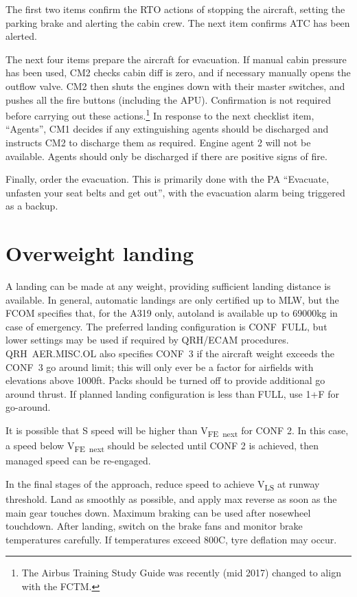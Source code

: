 \documentclass[a5paper,11pt,twoside]{book}
\newcommand{\multicite}[1]{
  \nopagebreak
  \noindent{\footnotesize\color{blue}{[ #1 ]}}
}
\newcommand{\V}[1]{V\textsubscript{#1}}
\begin{document}
The first two items confirm the RTO actions of stopping the aircraft, setting
the parking brake and alerting the cabin crew. The next item confirms ATC has
been alerted.

The next four items prepare the aircraft for evacuation. If manual cabin
pressure has been used, CM2 checks cabin diff is zero, and if necessary manually
opens the outflow valve. CM2 then shuts the engines down with their master
switches, and pushes all the fire buttons (including the APU). Confirmation is
not required before carrying out these actions.\footnote{The Airbus Training
Study Guide was recently (mid 2017) changed to align with the FCTM.}  In
response to the next checklist item, “Agents”, CM1 decides if any extinguishing
agents should be discharged and instructs CM2 to discharge them as
required. Engine agent 2 will not be available. Agents should only be discharged
if there are positive signs of fire.

Finally, order the evacuation. This is primarily done with the PA “Evacuate,
unfasten your seat belts and get out”, with the evacuation alarm being triggered
as a backup.

\multicite{EOMB~3.80.1, FCOM~PRO.AER.MISC, FCTM~PRO.AER.MISC}


\section{Overweight landing}

A landing can be made at any weight, providing sufficient landing distance is
available. In general, automatic landings are only certified up to MLW, but the
FCOM specifies that, for the A319 only, autoland is available up to 69000kg in
case of emergency. The preferred landing configuration is CONF~FULL, but lower
settings may be used if required by QRH/ECAM procedures. QRH~AER.MISC.OL also
specifies CONF~3 if the aircraft weight exceeds the CONF~3 go around limit; this
will only ever be a factor for airfields with elevations above 1000ft. Packs
should be turned off to provide additional go around thrust. If planned landing
configuration is less than FULL, use 1+F for go-around.

It is possible that S speed will be higher than \V{FE~next} for CONF 2. In this
case, a speed below \V{FE~next} should be selected until CONF 2 is achieved,
then managed speed can be re-engaged.

In the final stages of the approach, reduce speed to achieve \V{LS} at runway
threshold. Land as smoothly as possible, and apply max reverse as soon as the
main gear touches down. Maximum braking can be used after nosewheel
touchdown. After landing, switch on the brake fans and monitor brake
temperatures carefully. If temperatures exceed 800\textdegree C, tyre deflation may occur.
\end{document}
